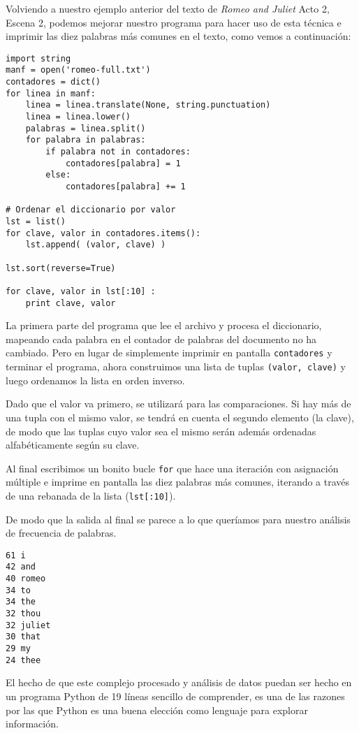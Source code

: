Volviendo a nuestro ejemplo anterior del texto de \emph{Romeo and Juliet}
Acto 2, Escena 2, podemos mejorar nuestro programa para hacer uso de esta técnica e
imprimir las diez palabras más comunes en el texto, como vemos a continuación:

\beforeverb
\begin{verbatim}
import string
manf = open('romeo-full.txt')
contadores = dict()
for linea in manf:
    linea = linea.translate(None, string.punctuation)
    linea = linea.lower()
    palabras = linea.split()
    for palabra in palabras:
        if palabra not in contadores:
            contadores[palabra] = 1
        else:
            contadores[palabra] += 1

# Ordenar el diccionario por valor
lst = list()
for clave, valor in contadores.items():
    lst.append( (valor, clave) )

lst.sort(reverse=True)

for clave, valor in lst[:10] :
    print clave, valor
\end{verbatim}
\afterverb
%
La primera parte del programa que lee el archivo y procesa
el diccionario, mapeando cada palabra en el contador de palabras del
documento no ha cambiado. Pero en lugar de simplemente imprimir en pantalla
{\tt contadores} y terminar el programa, ahora construimos una
lista de tuplas {\tt (valor, clave)} y luego ordenamos la lista en orden inverso.

Dado que el valor va primero, se utilizará para las comparaciones.
Si hay más de una tupla con el mismo valor, se tendrá en cuenta
el segundo elemento (la clave), de modo que las tuplas cuyo valor sea
el mismo serán además ordenadas alfabéticamente según su clave.

Al final escribimos un bonito bucle {\tt for} que hace una iteración con
asignación múltiple e imprime en pantalla las diez palabras más comunes,
iterando a través de una rebanada de la lista ({\tt lst[:10]}).

De modo que la salida al final se parece a lo que queríamos para
nuestro análisis de frecuencia de palabras.

\beforeverb
\begin{verbatim}
61 i
42 and
40 romeo
34 to
34 the
32 thou
32 juliet
30 that
29 my
24 thee
\end{verbatim}
\afterverb
%
El hecho de que este complejo procesado y análisis de datos
puedan ser hecho en un programa Python de 19 líneas
sencillo de comprender, es una de las razones por las que Python es una buena elección
como lenguaje para explorar información.

